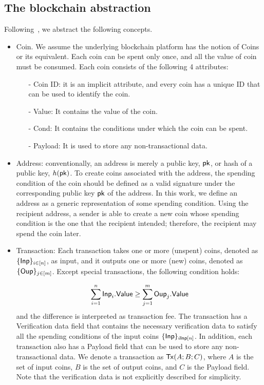 
\subsection{The blockchain abstraction}\label{se:bcabstraction}

Following~\cite{treasury}, we abstract the following concepts.
\begin{itemize}
	\item Coin. We assume the underlying blockchain platform has the notion of
Coins or its equivalent. Each coin can be spent only once, and all the value of
coin must be consumed. Each coin consists of the following
4 attributes:
	\begin{itemize}
		\item[-]Coin ID: it is an implicit attribute, and every coin has a unique ID that
can be used to identify the coin.
		\item[-] Value: It contains the value of the coin.
		\item[-]Cond: It contains the conditions under which the coin can be spent.
		\item[-] Payload: It is used to store any non-transactional data.
	\end{itemize}
	\item Address: conventionally, an
		address is merely a public key, $\mathsf{pk}$, or hash of a public key, $h(\mathsf{pk})$. To create
coins associated with the address, the spending condition of the coin should be
defined as a valid signature under the corresponding public key $\mathsf{pk}$ of the address.
In this work, we define an address as a generic representation of some spending
condition. Using the recipient address, a sender is able to create a new coin
whose spending condition is the one that the recipient intended; therefore, the
recipient may spend the coin later.
	\item Transaction: Each transaction takes one or more (unspent) coins, denoted
		as $\{\mathsf{Inp}\}_{i\in [n]}$, as input, and it outputs one or more (new) coins, denoted as
 $\{\mathsf{Oup}\}_{j\in [m]}$. Except special transactions, the following condition holds:

		$$\sum_{i=1}^n{\mathsf{Inp}_i.\mathsf{Value}} \geq \sum_{j=1}^m {\mathsf{Oup}_j.\mathsf{Value}}$$
		and the difference is interpreted as transaction fee.
		The transaction has a Verification data field that contains the necessary verification data to satisfy all the spending conditions of the input coins $\{\mathsf{Inp}\}_{i\mathsf{Inp}[n]}$. In addition, each transaction also has a Payload field that can be used to store any non-transactional data. We denote a transaction as $\mathsf{Tx}(A; B; C)$, where $A$ is the set
of input coins, $B$ is the set of output coins, and $C$ is the Payload field. Note that
the verification data is not explicitly described for simplicity.
\end{itemize}

